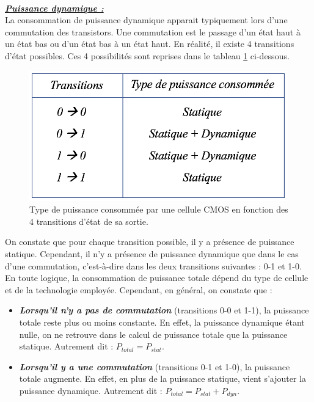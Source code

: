 \documentclass[10pt, oneside, a4paper]{article}
\begin{document}
\hspace{-0.5 cm}
\vspace{0.3 cm} \\
\hspace{-0.5 cm}\underline{\textbf{\textit{Puissance dynamique :}}} \vspace{0.2 cm} \\
La consommation de puissance dynamique apparait typiquement lors d'une commutation des transistors. Une commutation est le passage d'un état haut à un état bas ou d'un état bas à un état haut. En réalité, il existe 4 transitions d'état possibles. Ces 4 possibilités sont reprises dans le tableau \ref{fig:dyn} ci-dessous. 
\begin{figure}[htbp]
    \centering
    \includegraphics[scale=0.4]{image/dyn}
    \caption{Type de puissance consommée par une cellule CMOS en fonction des 4 transitions d'état de sa sortie.}
    \label{fig:dyn} 
\end{figure}

\hspace{-0.5 cm}On constate que pour chaque transition possible, il y a présence de puissance statique. Cependant, il n'y a présence de puissance dynamique que dans le cas d'une commutation, c'est-à-dire dans les deux transitions suivantes : 0-1 et 1-0.  En toute logique, la consommation de puissance totale dépend du type de cellule et de la technologie employée. Cependant, en général, on constate que : 
\begin{itemize}
\item \textbf{\textit{Lorsqu'il n'y a pas de commutation}} (transitions 0-0 et 1-1), la puissance totale reste plus ou moins constante. En effet, la puissance dynamique étant nulle, on ne retrouve dans le calcul de puissance totale que la puissance statique. Autrement dit : $P_{total}=P_{stat}$.
\item \textbf{\textit{Lorsqu'il y a une commutation}} (transitions 0-1 et 1-0), la puissance totale augmente. En effet, en plus de la puissance statique, vient s'ajouter la puissance dynamique. Autrement dit : $P_{total}=P_{stat}+P_{dyn}$.
\end{itemize}
\end{document}
